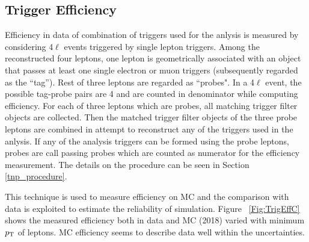 \subsection{Trigger Efficiency}

Efficiency in data of combination of triggers used for the anlysis 
is measured by considering 4$\ell$ events triggered by single lepton triggers. 
Among the reconstructed four leptons, one lepton is geometrically associated with an object that passes at least one single electron or muon triggers (subsequently regarded as the ``tag'').
Rest of three leptons are regarded as ``probes".
In a 4$\ell$ event, the possible tag-probe pairs are 4 and are counted in denominator while computing efficiency.
For each of three leptons which are probes, all matching trigger filter objects are collected. Then the matched trigger filter
objects of the three probe leptons are combined in attempt to reconstruct any of the triggers used in the anlysis. If any of the analysis triggers
can be formed using the probe leptons, probes are call passing probes which are counted as numerator for the efficiency measurement. The details on the procedure can be seen in Section \ref{tnp_procedure}.

This technique is used to measure efficiency on MC and the comparison with data is exploited to estimate the reliability of simulation.
 Figure ~\ref{Fig:TrigEffC} shows the measured efficiency both in data and MC (2018) varied with minimum $p_{\rm{T}}$ of leptons. MC efficiency seems to describe data well within the uncertainties.

